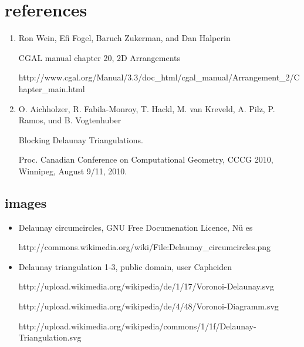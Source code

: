 \documentclass[a4paper,12pt]{article}
\begin{document}
\section{references}
\small
\begin{enumerate}
\item
\label{ref:cgal}
Ron Wein, Efi Fogel, Baruch Zukerman, and Dan Halperin

CGAL manual chapter 20, 2D Arrangements

http://www.cgal.org/Manual/3.3/doc\_html/cgal\_manual/Arrangement\_2/Chapter\_main.html

\item
\label{ref:blocking}
O. Aichholzer, R. Fabila-Monroy, T. Hackl, M. van Kreveld, A. Pilz, P. Ramos, und B. Vogtenhuber

Blocking Delaunay Triangulations. 

Proc. Canadian Conference on Computational Geometry, CCCG 2010, Winnipeg, August 9/11, 2010. 

\end{enumerate}



\subsection{images}
\begin{itemize}
\item
Delaunay circumcircles, GNU Free Documenation Licence, N\"u es

http://commons.wikimedia.org/wiki/File:Delaunay\_circumcircles.png

\item
Delaunay triangulation 1-3, public domain, user Capheiden 

http://upload.wikimedia.org/wikipedia/de/1/17/Voronoi-Delaunay.svg

http://upload.wikimedia.org/wikipedia/de/4/48/Voronoi-Diagramm.svg

http://upload.wikimedia.org/wikipedia/commons/1/1f/Delaunay-Triangulation.svg
\end{itemize}



\newpage
\label{ref:SKA}
\end{document}
